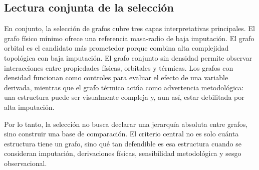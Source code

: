 \subsection*{Lectura conjunta de la selección}

En conjunto, la selección de grafos cubre tres capas interpretativas principales. El grafo físico mínimo ofrece una referencia masa-radio de baja imputación. El grafo orbital es el candidato más prometedor porque combina alta complejidad topológica con baja imputación. El grafo conjunto sin densidad permite observar interacciones entre propiedades físicas, orbitales y térmicas. Los grafos con densidad funcionan como controles para evaluar el efecto de una variable derivada, mientras que el grafo térmico actúa como advertencia metodológica: una estructura puede ser visualmente compleja y, aun así, estar debilitada por alta imputación.

Por lo tanto, la selección no busca declarar una jerarquía absoluta entre grafos, sino construir una base de comparación. El criterio central no es solo cuánta estructura tiene un grafo, sino qué tan defendible es esa estructura cuando se consideran imputación, derivaciones físicas, sensibilidad metodológica y sesgo observacional.